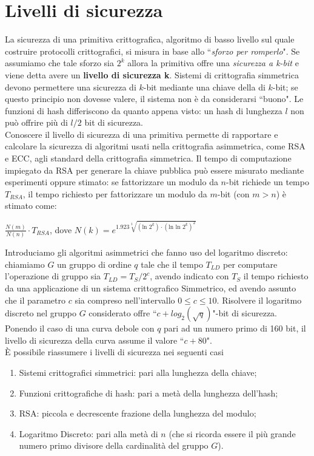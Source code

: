 \documentclass[a4paper,12pt]{tesiinfo}
\newcommand\ddfrac[2]{\frac{\displaystyle #1}{\displaystyle #2}}
\begin{document}
\chapter{Livelli di sicurezza}
La sicurezza di una primitiva crittografica, algoritmo di basso livello sul quale costruire protocolli crittografici, si misura in base allo ``\textit{sforzo per romperlo}". Se assumiamo che tale sforzo sia $2^k$ allora la primitiva offre una \textit{sicurezza a k-bit} e viene detta avere un \textbf{livello di sicurezza k}. Sistemi di crittografia simmetrica devono permettere una sicurezza di $k$-bit mediante una chiave della di $k$-bit; se questo principio non dovesse valere, il sistema non \`e da considerarsi ``buono". Le funzioni di hash differiscono da quanto appena visto: un hash di lunghezza $l$ non pu\`o offrire pi\`u di $l \big / 2$ bit di sicurezza. 
\\
Conoscere il livello di sicurezza di una primitiva permette di rapportare e calcolare la sicurezza di algoritmi usati nella crittografia asimmetrica, come RSA e ECC, agli standard della crittografia simmetrica. Il tempo di computazione impiegato da RSA per generare la chiave pubblica pu\`o essere misurato mediante esperimenti oppure stimato: se fattorizzare un modulo da $n$-bit richiede un tempo $T_{RSA}$, il tempo richiesto per fattorizzare un modulo da $m$-bit (con $m>n$) \`e stimato come: 
\begin{center}
 $ \ddfrac{N(m)}{N(n)} \cdot T_{RSA}$, dove $N(k) = e^{1.923 \sqrt[3]{( \text{ln }2^k) \cdot ( \text{ln ln }2^k)^{2}}}$
\end{center}
Introduciamo gli algoritmi asimmetrici che fanno uso del logaritmo discreto: chiamiamo $G$ un gruppo di ordine $q$ tale che il tempo $T_{LD}$ per computare l'operazione di gruppo sia $T_{LD} = T_S \big / 2^c$, avendo indicato con $T_S$ il tempo richiesto da una applicazione di un sistema crittografico Simmetrico, ed avendo assunto che il parametro $c$ sia compreso nell'intervallo $0 \leq c \leq 10$. Risolvere il logaritmo discreto nel gruppo $G$ considerato offre ``$c+log_2(\sqrt{q})$"-bit di sicurezza. Ponendo il caso di una curva debole con $q$ pari ad un numero primo di 160 bit, il livello di sicurezza della curva assume il valore ``$c+80$".
\\
\`E possibile riassumere i livelli di sicurezza nei seguenti casi
\begin{enumerate}
 \item Sistemi crittografici simmetrici: pari alla lunghezza della chiave;
 \item Funzioni crittografiche di hash: pari a met\`a della lunghezza dell'hash;
 \item RSA: piccola e decrescente frazione della lunghezza del modulo;
 \item Logaritmo Discreto: pari alla met\`a di $n$ (che si ricorda essere il pi\`u grande numero primo divisore della cardinalit\`a del gruppo $G$).
\end{enumerate}
\end{document}
